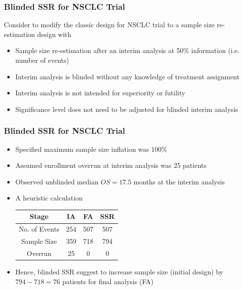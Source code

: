\documentclass{beamer}
\begin{document}
\begin{frame}
	\frametitle{Blinded SSR for NSCLC Trial}
Consider to modify the classic design for NSCLC trial to a sample size re-estimation design with 
\begin{itemize}
  \item Sample size re-estimation after an interim analysis at 50\% information (i.e. number of events)
  \item Interim analysis is blinded without any knowledge of treatment assignment
  \item Interim analysis is not intended for superiority or futility
  \item Significance level does not need to be adjusted for blinded interim analysis
\end{itemize}
\end{frame}
\begin{frame}
	\frametitle{Blinded SSR for NSCLC Trial}
	\begin{itemize}
		\item Specified maximum sample size inflation was 100\%
		\item Assumed enrollment overrun at interim analysis was 25 patients
		\item Observed unblinded median $OS = 17.5$ months at the interim analysis 
		\item A heuristic calculation \vspace{8pt}
		\begin{centering}
		\begin{tabular}{cccc}
			Stage & IA & FA & SSR \\ \hline
			No. of Events & 254 & 507 & 507 \\
			Sample Size & 359 & 718 & 794 \\
			Overrun & 25 & 0 & 0 \\ \hline
		\end{tabular}
		\end{centering}
		\item Hence, blinded SSR suggest to increase sample size (initial design) by $794-718=76$ patients for final analysis (FA)
	\end{itemize}
\end{frame}
\end{document}
